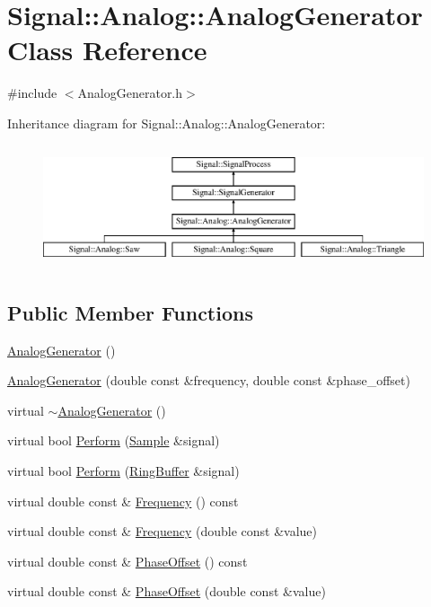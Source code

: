 \hypertarget{classSignal_1_1Analog_1_1AnalogGenerator}{\section{Signal\+:\+:Analog\+:\+:Analog\+Generator Class Reference}
\label{classSignal_1_1Analog_1_1AnalogGenerator}
}


{\ttfamily \#include $<$Analog\+Generator.\+h$>$}

Inheritance diagram for Signal\+:\+:Analog\+:\+:Analog\+Generator\+:\begin{figure}[H]
\begin{center}
\leavevmode
\includegraphics[height=3.660131cm]{classSignal_1_1Analog_1_1AnalogGenerator}
\end{center}
\end{figure}
\subsection*{Public Member Functions}
\begin{DoxyCompactItemize}
\item 
\hyperlink{classSignal_1_1Analog_1_1AnalogGenerator_ab5cf1522c33fa21b004ddf9cb4c66ba8}{Analog\+Generator} ()
\item 
\hyperlink{classSignal_1_1Analog_1_1AnalogGenerator_a8b4acd56abb3799a923dc5b1dbb16c1c}{Analog\+Generator} (double const \&frequency, double const \&phase\+\_\+offset)
\item 
virtual \hyperlink{classSignal_1_1Analog_1_1AnalogGenerator_aabc5dc2109a90d1d97a0c400a3028d79}{$\sim$\+Analog\+Generator} ()
\item 
virtual bool \hyperlink{classSignal_1_1Analog_1_1AnalogGenerator_a435d695634a52cff8249dde68be18e8a}{Perform} (\hyperlink{classSignal_1_1Sample}{Sample} \&signal)
\item 
virtual bool \hyperlink{classSignal_1_1Analog_1_1AnalogGenerator_a8aa38b6c3f259b62b293f235cf1cc906}{Perform} (\hyperlink{classSignal_1_1RingBuffer}{Ring\+Buffer} \&signal)
\item 
virtual double const \& \hyperlink{classSignal_1_1SignalGenerator_a96af42ee68f94e9b04d034fd68b73ecd}{Frequency} () const 
\item 
virtual double const \& \hyperlink{classSignal_1_1SignalGenerator_af83b532bf3ddc3637c2fd7a1dfd095cb}{Frequency} (double const \&value)
\item 
virtual double const \& \hyperlink{classSignal_1_1SignalGenerator_ac2538ec946f001e394d2416fda698d1c}{Phase\+Offset} () const 
\item 
virtual double const \& \hyperlink{classSignal_1_1SignalGenerator_ac6a103ff72beaa338f6d18c812522d78}{Phase\+Offset} (double const \&value)
\end{DoxyCompactItemize}
